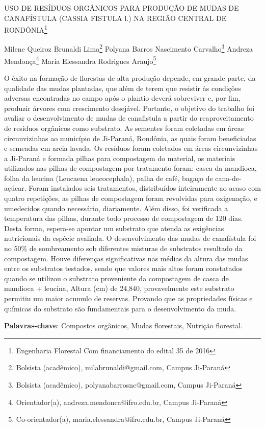 \documentclass[article,12pt,onesidea,4paper,english,brazil]{abntex2}
\begin{document}
	
	
	\frenchspacing 
	
	\begin{center}
		\LARGE USO DE RESÍDUOS ORGÂNICOS PARA PRODUÇÃO DE MUDAS DE CANAFÍSTULA
		(CASSIA FISTULA l.) NA REGIÃO CENTRAL DE RONDÔNIA\footnote{Engenharia Florestal
			Com financiamento do edital 35 de 2016}
		
		\normalsize
		Milene Queiroz Brunaldi Lima\footnote{Bolsista (acadêmico), milabrunaldi@gmail.com, Campus Ji-Paraná} 
		Polyana Barros Nascimento Carvalho\footnote{Bolsista (acadêmico), polyanabarrosnc@gmail.com, Campus Ji-Paraná} 
		Andreza Mendonça\footnote{Orientador(a), andreza.mendonca@ifro.edu.br, Campus Ji-Paraná} 
		Maria Elessandra Rodrigues Araujo\footnote{Co-orientador(a), maria.elessandra@ifro.edu.br, Campus Ji-Paraná} 
	\end{center}
	
	\noindent O êxito na formação de florestas de alta produção depende, em grande parte, da qualidade
	das mudas plantadas, que além de terem que resistir às condições adversas encontradas no
	campo após o plantio deverá sobreviver e, por fim, produzir árvores com crescimento
	desejável. Portanto, o objetivo do trabalho foi avaliar o desenvolvimento de mudas de
	canafistula a partir do reaproveitamento de resíduos orgânicos como substrato. As sementes
	foram coletadas em áreas circunvizinhas ao município de Ji-Paraná, Rondônia, as quais
	foram beneficiadas e semeadas em areia lavada. Os resíduos foram coletados em áreas
	circunvizinhas a Ji-Paraná e formada pilhas para compostagem do material, os materiais
	utilizados nas pilhas de compostagem por tratamento foram: casca da mandioca, folha da
	leucina (Leucaena leucocephala), palha de café, bagaço de cana-de-açúcar. Foram
	instalados seis tratamentos, distribuídos inteiramente ao acaso com quatro repetições, as
	pilhas de compostagem foram revolvidas para oxigenação, e umedecidos quando
	necessário, diariamente. Além disso, foi verificada a temperatura das pilhas, durante todo
	processo de compostagem de 120 dias. Desta forma, espera-se apontar um substrato que
	atenda as exigências nutricionais da espécie avaliada. O desenvolvimento das mudas de
	canafístula foi no 50\% de sombreamento sob diferentes misturas de substratos resultado da
	compostagem. Houve diferenças significativas nas médias da altura das mudas entre os
	substratos testados, sendo que valores mais altos foram constatados quando se utilizou o
	substrato proveniente da compostagem de casca de mandioca + leucina, Altura (cm) de
	24,840, provavelmente este substrato permitiu um maior acumulo de reservas. Provando
	que as propriedades físicas e químicas do substrato são fundamentais para o
	desenvolvimento da muda.
	
	\vspace{\onelineskip}
	
	\noindent
	\textbf{Palavras-chave}: Compostos orgânicos, Mudas florestais, Nutrição florestal.
	
\end{document}
